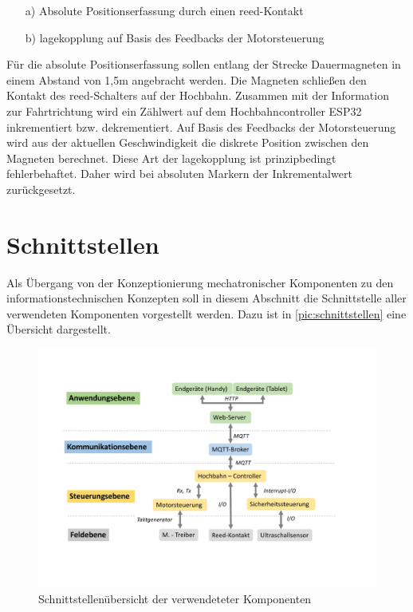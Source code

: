  \begin{itemize}
 	\item [a)] Absolute Positionserfassung durch einen \acrshort{reed}-Kontakt
 	\item[b)] \acrshort{lagekopplung} auf Basis des Feedbacks der Motorsteuerung  
 \end{itemize}

Für die absolute Positionserfassung sollen entlang der Strecke Dauermagneten in einem Abstand von 1,5m angebracht werden. Die Magneten schließen den Kontakt des  \acrshort{reed}-Schalters auf der Hochbahn. Zusammen mit der Information zur Fahrtrichtung wird ein Zählwert auf dem Hochbahncontroller ESP32 inkrementiert bzw. dekrementiert. Auf Basis des Feedbacks der Motorsteuerung wird aus der aktuellen Geschwindigkeit die diskrete Position zwischen den Magneten berechnet. Diese Art der \acrshort{lagekopplung} ist prinzipbedingt fehlerbehaftet. Daher wird bei absoluten Markern der Inkrementalwert zurückgesetzt. 
\newpage

\section{Schnittstellen}
\label{sec:konzeptSchnittstellen}
Als Übergang von der Konzeptionierung mechatronischer Komponenten zu den informationstechnischen Konzepten soll in diesem Abschnitt die Schnittstelle aller verwendeten Komponenten vorgestellt werden. Dazu ist in \autoref{pic:schnittstellen} eine Übersicht dargestellt.

\begin{figure}[h]
	\centering
	\includegraphics[width=16cm]{schnittstellen.pdf}
	\caption{Schnittstellenübersicht der verwendeteter Komponenten}
	\label{pic:schnittstellen}
\end{figure}

